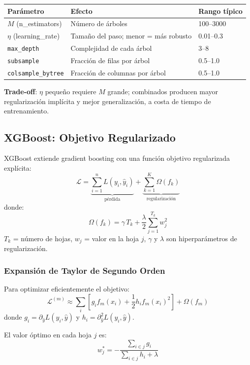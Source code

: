 \documentclass[12pt, a4paper]{article}
\begin{document}
\begin{center}
\begin{tabular}{lll}
\toprule
\textbf{Parámetro} & \textbf{Efecto} & \textbf{Rango típico} \\
\midrule
$M$ (n\_estimators) & Número de árboles & 100–3000 \\
$\eta$ (learning\_rate) & Tamaño del paso; menor = más robusto & 0.01–0.3 \\
\texttt{max\_depth} & Complejidad de cada árbol & 3–8 \\
\texttt{subsample} & Fracción de filas por árbol & 0.5–1.0 \\
\texttt{colsample\_bytree} & Fracción de columnas por árbol & 0.5–1.0 \\
\bottomrule
\end{tabular}
\end{center}

\begin{notebox}
  \textbf{Trade-off}: $\eta$ pequeño requiere $M$ grande; combinados producen mayor
  regularización implícita y mejor generalización, a costa de tiempo de entrenamiento.
\end{notebox}

\subsection{XGBoost: Objetivo Regularizado}

XGBoost extiende gradient boosting con una función objetivo regularizada explícita:
\[
  \mathcal{L} = \underbrace{\sum_{i=1}^n L(y_i, \hat{y}_i)}_{\text{pérdida}} +
  \underbrace{\sum_{k=1}^K \Omega(f_k)}_{\text{regularización}}
\]
donde:
\[
  \Omega(f_k) = \gamma\, T_k + \frac{\lambda}{2}\sum_{j=1}^{T_k} w_j^2
\]
$T_k$ = número de hojas, $w_j$ = valor en la hoja $j$, $\gamma$ y $\lambda$ son
hiperparámetros de regularización.

\subsubsection{Expansión de Taylor de Segundo Orden}
Para optimizar eficientemente el objetivo:
\[
  \mathcal{L}^{(m)} \approx \sum_i \left[
    g_i f_m(x_i) + \frac{1}{2} h_i f_m(x_i)^2
  \right] + \Omega(f_m)
\]
donde $g_i = \partial_{\hat{y}} L(y_i, \hat{y})$ y $h_i = \partial^2_{\hat{y}} L(y_i, \hat{y})$.

El valor óptimo en cada hoja $j$ es:
\[
  w_j^* = -\frac{\sum_{i\in j} g_i}{\sum_{i\in j} h_i + \lambda}
\]
\end{document}
